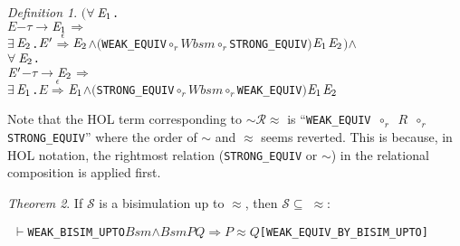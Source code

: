 \documentclass[GCNS]{yincog}
\renewcommand{\HOLinline}[1]{\mbox{\textup{\texttt{#1}}}}
\renewcommand{\HOLConst}[1]{\texttt{#1}}
\renewcommand{\HOLBoundVar}[1]{\ensuremath{\mathit{#1}}}
\renewcommand{\HOLFreeVar}[1]{\ensuremath{\mathit{#1}}}
\renewcommand{\HOLSymConst}[1]{#1}
\renewcommand{\HOLTokenConj}{\ensuremath{\wedge}}
\renewcommand{\HOLTokenRCompose}{\ensuremath{\circ _r}}
\renewcommand{\HOLTokenExists}{\ensuremath{\exists \,}}
\renewcommand{\HOLTokenForall}{\ensuremath{\forall \,}}
\renewcommand{\HOLTokenTurnstile}{\ensuremath{\:\:\vdash}}
\theoremstyle{remark}
\newtheorem{definition}{Definition}[section]
\theoremstyle{theorem}
\newtheorem{theorem}[definition]{Theorem}
\theoremstyle{remark}
\newcommand{\HOLTokenWeakEQ}{$\approx$}
\newcommand{\HOLTokenEPS}{$\overset{\epsilon}{\Longrightarrow}$}
\newcommand{\HOLTokenTransBegin}{$-$}
\newcommand{\HOLTokenTransEnd}{$\rightarrow$\xspace}
\renewcommand{\HOLTokenImp}{\ensuremath{\Longrightarrow}}
\def\Rvtex{\mathcal{R}}
\newcommand{\wbvtex}{\approx}
\begin{document}
\begin{definition}
\begin{alltt}
         \ensuremath{(}\HOLSymConst{\HOLTokenForall{}}\ensuremath{\HOLBoundVar{E}\sb{\mathrm{1}}}.
              \HOLBoundVar{E} \HOLTokenTransBegin\HOLSymConst{\ensuremath{\tau}}\HOLTokenTransEnd \ensuremath{\HOLBoundVar{E}\sb{\mathrm{1}}} \HOLSymConst{\HOLTokenImp{}}
              \HOLSymConst{\HOLTokenExists{}}\ensuremath{\HOLBoundVar{E}\sb{\mathrm{2}}}. \ensuremath{\HOLBoundVar{E}\sp{\prime}} \HOLSymConst{\HOLTokenEPS} \ensuremath{\HOLBoundVar{E}\sb{\mathrm{2}}} \HOLSymConst{\HOLTokenConj{}} \ensuremath{(}\HOLConst{WEAK\_EQUIV} \HOLSymConst{\HOLTokenRCompose{}} \HOLFreeVar{Wbsm} \HOLSymConst{\HOLTokenRCompose{}} \HOLConst{STRONG\_EQUIV}\ensuremath{)} \ensuremath{\HOLBoundVar{E}\sb{\mathrm{1}}} \ensuremath{\HOLBoundVar{E}\sb{\mathrm{2}}}\ensuremath{)} \HOLSymConst{\HOLTokenConj{}}
         \HOLSymConst{\HOLTokenForall{}}\ensuremath{\HOLBoundVar{E}\sb{\mathrm{2}}}.
             \ensuremath{\HOLBoundVar{E}\sp{\prime}} \HOLTokenTransBegin\HOLSymConst{\ensuremath{\tau}}\HOLTokenTransEnd \ensuremath{\HOLBoundVar{E}\sb{\mathrm{2}}} \HOLSymConst{\HOLTokenImp{}}
             \HOLSymConst{\HOLTokenExists{}}\ensuremath{\HOLBoundVar{E}\sb{\mathrm{1}}}. \HOLBoundVar{E} \HOLSymConst{\HOLTokenEPS} \ensuremath{\HOLBoundVar{E}\sb{\mathrm{1}}} \HOLSymConst{\HOLTokenConj{}} \ensuremath{(}\HOLConst{STRONG\_EQUIV} \HOLSymConst{\HOLTokenRCompose{}} \HOLFreeVar{Wbsm} \HOLSymConst{\HOLTokenRCompose{}} \HOLConst{WEAK\_EQUIV}\ensuremath{)} \ensuremath{\HOLBoundVar{E}\sb{\mathrm{1}}} \ensuremath{\HOLBoundVar{E}\sb{\mathrm{2}}}
\end{alltt}
%
\end{definition}
%
Note that the HOL term corresponding to $\sim \Rvtex \wbvtex $ is ``\HOLinline{\HOLConst{WEAK\_EQUIV} \HOLSymConst{\HOLTokenRCompose{}} \HOLFreeVar{R} \HOLSymConst{\HOLTokenRCompose{}} \HOLConst{STRONG\_EQUIV}}''
where the order of $\sim $ and $\approx $ seems reverted. This is because,
in HOL notation, the rightmost relation (\HOLinline{\HOLConst{STRONG\_EQUIV}}
or $\sim $) in the relational composition is applied first.

\begin{theorem}
If $\mathcal{S}$ is a bisimulation up to $\approx $, then
$\mathcal{S} \subseteq \;\approx $:
%
\begin{alltt}
\HOLTokenTurnstile{} \HOLConst{WEAK\_BISIM\_UPTO} \HOLFreeVar{Bsm} \HOLSymConst{\HOLTokenConj{}} \HOLFreeVar{Bsm} \HOLFreeVar{P} \HOLFreeVar{Q} \HOLSymConst{\HOLTokenImp{}} \HOLFreeVar{P} \HOLSymConst{\HOLTokenWeakEQ} \HOLFreeVar{Q}\hfill{[WEAK\_EQUIV\_BY\_BISIM\_UPTO]}
\end{alltt}
%
\end{theorem}
\end{document}
